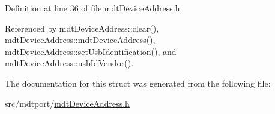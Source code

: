 Definition at line 36 of file mdt\-Device\-Address.\-h.



Referenced by mdt\-Device\-Address\-::clear(), mdt\-Device\-Address\-::mdt\-Device\-Address(), mdt\-Device\-Address\-::set\-Usb\-Identification(), and mdt\-Device\-Address\-::usb\-Id\-Vendor().



The documentation for this struct was generated from the following file\-:\begin{DoxyCompactItemize}
\item 
src/mdtport/\hyperlink{mdt_device_address_8h}{mdt\-Device\-Address.\-h}\end{DoxyCompactItemize}
